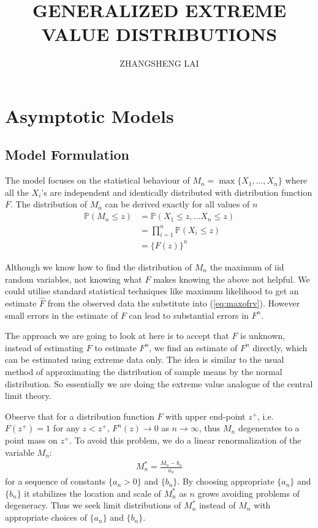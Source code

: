\documentclass[a4paper,10pt]{article}
\theoremstyle{definition}
\numberwithin{equation}{section}
\begin{document}

\title{\large \bf GENERALIZED EXTREME VALUE DISTRIBUTIONS}
\author{\small ZHANGSHENG LAI}
\date{}
\maketitle

\section{Asymptotic Models}
\subsection{Model Formulation}
The model focuses on the statistical behaviour of $M_n = \max\{X_1,\ldots,X_n\}$ where all the $X_i$'s are independent and identically distributed with distribution function $F$. The distribution of $M_n$ can be derived exactly for all values of $n$
\begin{align}
\mathbb{P}(M_n\leq z) &= \mathbb{P}(X_1\leq z , \ldots X_n \leq z)\nonumber\\
&= \prod_{i=1}^{n}\mathbb{P}(X_i\leq z)\nonumber\\
&=\{F(z)\}^n \label{eq:maxofrv}
\end{align}

Although we know how to find the distribution of $M_n$ the maximum of iid random variables, not knowing what $F$ makes knowing the above not helpful. We could utilise standard statistical techniques like maximum likelihood to get an estimate $\widehat{F}$ from the observed data the substitute into (\ref{eq:maxofrv}). However small errors in the estimate of $F$ can lead to substantial errors in $F^n$.

The approach we are going to look at here is to accept that $F$ is unknown, instead of estimating $F$ to estimate $F^n$, we find an estimate of $F^n$ directly, which can be estimated using extreme data only. The idea is similar to the usual method of approximating the distribution of sample means by the normal distribution. So essentially we are doing the extreme value analogue of the central limit theory.

Observe that for a distribution function $F$ with upper end-point $z^+$, i.e. $F(z^+) = 1$ for any $z<z^+$, $F^n(z) \to 0$ as $n \to \infty$, thus $M_n$ degenerates to a point mass on $z^+$. To avoid this problem, we do a linear renormalization of the variable $M_n$:
\begin{align*}
M_n^\ast = \frac{M_n - b_n}{a_n}
\end{align*}
for a sequence of constants $\{a_n>0\}$ and $\{b_n\}$. By choosing appropriate $\{a_n\}$ and $\{b_n\}$ it stabilizes the location and scale of $M_n^\ast$ as $n$ grows avoiding problems of degeneracy. Thus we seek limit distributions of $M_n^\ast$ instead of $M_n$ with appropriate choices of $\{a_n\}$ and $\{b_n\}$.
\end{document}
